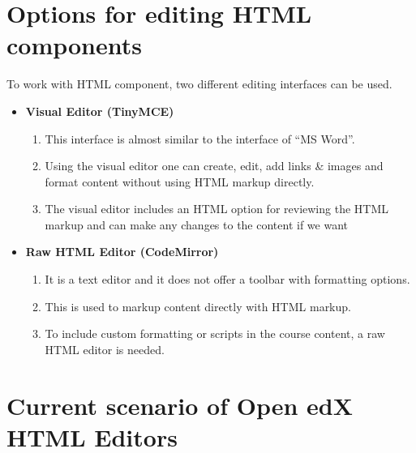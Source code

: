 \section{Options for editing HTML components}
To work with HTML component, two different editing interfaces can be used.
\begin{itemize}
	\item \textbf{Visual Editor (TinyMCE) }\newline
		\begin{enumerate}
			\item This interface is almost similar to the interface of “MS Word”.
			\item Using the visual editor one can create, edit, add links \& images and format content
without using HTML markup directly.
			\item The visual editor includes an HTML option for reviewing the HTML markup and can
make any changes to the content if we want
		\end{enumerate}
	\item \textbf{Raw HTML Editor (CodeMirror) }\newline
		\begin{enumerate}
			\item It is a text editor and it does not offer a toolbar with formatting options.
			\item This is used to markup content directly with HTML markup.
			\item To include custom formatting or scripts in the course content, a raw HTML editor
is needed.
		\end{enumerate}
\end{itemize}

\section{Current scenario of Open edX HTML Editors}

